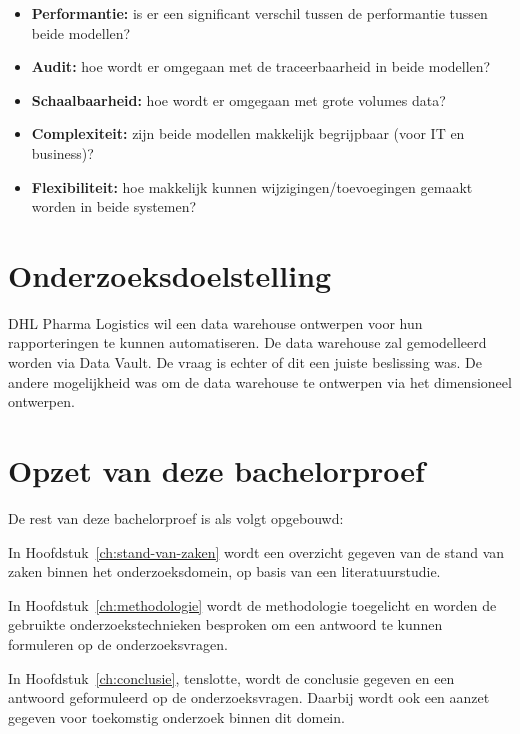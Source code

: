 \begin{itemize}
	\item \textbf{Performantie:} is er een significant verschil tussen de performantie tussen beide modellen?
	\item \textbf{Audit:} hoe wordt er omgegaan met de traceerbaarheid in beide modellen?
	\item \textbf{Schaalbaarheid:} hoe wordt er omgegaan met grote volumes data?
	\item \textbf{Complexiteit:} zijn beide modellen makkelijk begrijpbaar (voor IT en business)?
	\item \textbf{Flexibiliteit:} hoe makkelijk kunnen wijzigingen/toevoegingen gemaakt worden in beide systemen?
	
\end{itemize}

\section{Onderzoeksdoelstelling}
\label{sec:onderzoeksdoelstelling}
DHL Pharma Logistics wil een data warehouse ontwerpen voor hun rapporteringen te kunnen automatiseren. De data warehouse zal gemodelleerd worden via Data Vault. De vraag is echter of dit een juiste beslissing was. De andere mogelijkheid was om de data warehouse te ontwerpen via het dimensioneel ontwerpen. 

\section{Opzet van deze bachelorproef}
\label{sec:opzet-bachelorproef}


De rest van deze bachelorproef is als volgt opgebouwd:

In Hoofdstuk~\ref{ch:stand-van-zaken} wordt een overzicht gegeven van de stand van zaken binnen het onderzoeksdomein, op basis van een literatuurstudie.

In Hoofdstuk~\ref{ch:methodologie} wordt de methodologie toegelicht en worden de gebruikte onderzoekstechnieken besproken om een antwoord te kunnen formuleren op de onderzoeksvragen.


In Hoofdstuk~\ref{ch:conclusie}, tenslotte, wordt de conclusie gegeven en een antwoord geformuleerd op de onderzoeksvragen. Daarbij wordt ook een aanzet gegeven voor toekomstig onderzoek binnen dit domein.

